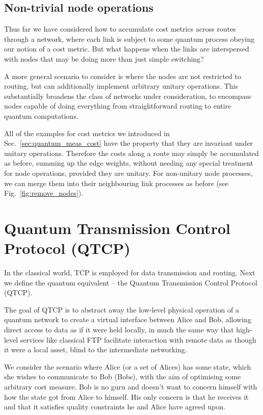 \documentclass[aps, rmp, twocolumn, amsmath, amssymb, nofootinbib, superscriptaddress, longbibliography, floatfix, table-of-contents, eqsecnum]{revtex4-1}
\begin{document}
%
%

\subsection{Non-trivial node operations}

Thus far we have considered how to accumulate cost metrics across routes through a network, where each link is subject to some quantum process obeying our notion of a cost metric. But what happens when the links are interspersed with nodes that may be doing more than just simple switching?

A more general scenario to consider is where the nodes are not restricted to routing, but can additionally implement arbitrary unitary operations. This substantially broadens the class of networks under consideration, to encompass nodes capable of doing everything from straightforward routing to entire quantum computations.

All of the examples for cost metrics we introduced in Sec.~\ref{sec:quantum_meas_cost} have the property that they are invariant under unitary operations. Therefore the costs along a route may simply be accumulated as before, summing up the edge weights, without needing any special treatment for node operations, provided they are unitary. For non-unitary node processes, we can merge them into their neighbouring link processes as before (see Fig.~\ref{fig:remove_nodes}).

%
%

\section{Quantum Transmission Control Protocol (QTCP)} \label{sec:QTCP}

In the classical world, TCP is employed for data transmission and routing. Next we define the quantum equivalent -- the Quantum Transmission Control Protocol (QTCP).

The goal of QTCP is to abstract away the low-level physical operation of a quantum network to create a virtual interface between Alice and Bob, allowing direct access to data as if it were held locally, in much the same way that high-level services like classical FTP facilitate interaction with remote data as though it were a local asset, blind to the intermediate networking.

We consider the scenario where Alice (or a set of Alices) has some state, which she wishes to communicate to Bob (Bobs), with the aim of optimising some arbitrary cost measure. Bob is no guru and doesn't want to concern himself with how the state got from Alice to himself. His only concern is that he receives it and that it satisfies quality constraints he and Alice have agreed upon.
\end{document}
